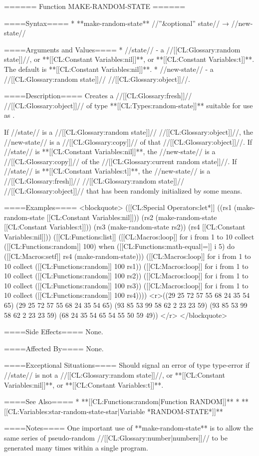====== Function MAKE-RANDOM-STATE ======

====Syntax====
  * **make-random-state** //''&optional'' state// → //new-state//

====Arguments and Values====
  * //state// - a //[[CL:Glossary:random state]]//, or **[[CL:Constant Variables:nil]]**, or **[[CL:Constant Variables:t]]**. The default is **[[CL:Constant Variables:nil]]**.
  * //new-state// - a //[[CL:Glossary:random state]]// //[[CL:Glossary:object]]//.

====Description====
Creates a //[[CL:Glossary:fresh]]// //[[CL:Glossary:object]]// of type **[[CL:Types:random-state]]** suitable for use as .

If //state// is a //[[CL:Glossary:random state]]// //[[CL:Glossary:object]]//, the //new-state// is a //[[CL:Glossary:copy]]// of that //[[CL:Glossary:object]]//. If //state// is **[[CL:Constant Variables:nil]]**, the //new-state// is a //[[CL:Glossary:copy]]// of the //[[CL:Glossary:current random state]]//. If //state// is **[[CL:Constant Variables:t]]**, the //new-state// is a //[[CL:Glossary:fresh]]// //[[CL:Glossary:random state]]// //[[CL:Glossary:object]]// that has been randomly initialized by some means.

====Examples====
<blockquote> 
([[CL:Special Operators:let*]] ((rs1 (make-random-state [[CL:Constant Variables:nil]])) 
       (rs2 (make-random-state [[CL:Constant Variables:t]]))
       (rs3 (make-random-state rs2)) 
       (rs4 [[CL:Constant Variables:nil]])) 
  ([[CL:Functions:list]] ([[CL:Macros:loop]] for i from 1 to 10 collect ([[CL:Functions:random]] 100) when ([[CL:Functions:math-equal|=]] i 5) do ([[CL:Macros:setf]] rs4 (make-random-state))) 
        ([[CL:Macros:loop]] for i from 1 to 10 collect ([[CL:Functions:random]] 100 rs1)) 
        ([[CL:Macros:loop]] for i from 1 to 10 collect ([[CL:Functions:random]] 100 rs2)) 
        ([[CL:Macros:loop]] for i from 1 to 10 collect ([[CL:Functions:random]] 100 rs3)) 
        ([[CL:Macros:loop]] for i from 1 to 10 collect ([[CL:Functions:random]] 100 rs4)))) 
<r>((29 25 72 57 55 68 24 35 54 65) 
 (29 25 72 57 55 68 24 35 54 65) 
 (93 85 53 99 58 62 2 23 23 59) 
 (93 85 53 99 58 62 2 23 23 59) 
 (68 24 35 54 65 54 55 50 59 49)) </r>
 </blockquote>

====Side Effects====
None.

====Affected By====
None.

====Exceptional Situations====
Should signal an error of type type-error if //state// is not a //[[CL:Glossary:random state]]//, or **[[CL:Constant Variables:nil]]**, or **[[CL:Constant Variables:t]]**.

====See Also====
  * **[[CL:Functions:random|Function RANDOM]]**
  * **[[CL:Variables:star-random-state-star|Variable *RANDOM-STATE*]]**

====Notes====
One important use of **make-random-state** is to allow the same series of pseudo-random //[[CL:Glossary:number|numbers]]// to be generated many times within a single program.
